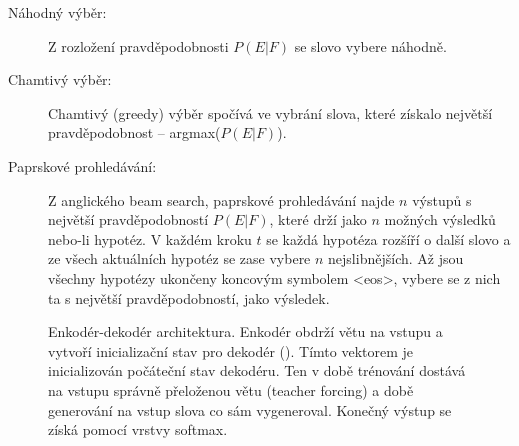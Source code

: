 \begin{description}
  \item[Náhodný výběr:] Z rozložení pravděpodobnosti $P(E|F)$ se slovo vybere náhodně.
  \item[Chamtivý výběr:] Chamtivý (greedy) výběr spočívá ve vybrání slova, které získalo největší pravděpodobnost -- argmax($P(E|F)$).
  \item[Paprskové prohledávání:]\label{decsription:beamsearch} Z anglického beam search, paprskové prohledávání najde $n$ výstupů s největší pravděpodobností $P(E|F)$, které drží jako $n$ možných výsledků nebo-li hypotéz. V každém kroku $t$ se každá hypotéza rozšíří o další slovo a ze všech aktuálních hypotéz se zase vybere $n$ nejslibnějších. Až jsou všechny hypotézy ukončeny koncovým symbolem <eos>, vybere se z nich ta s největší pravděpodobností, jako výsledek.
\end{description}


\begin{figure}[H]
    \begin{center}
    \end{center}
	\caption{Enkodér-dekodér architektura. Enkodér obdrží větu na vstupu a vytvoří inicializační stav pro dekodér (). Tímto vektorem je inicializován počáteční stav dekodéru. Ten v době trénování dostává na vstupu správně přeloženou větu (teacher forcing) a době generování na vstup slova co sám vygeneroval. Konečný výstup se získá pomocí vrstvy softmax.}
	\label{img:seq2seq}
\end{figure}

